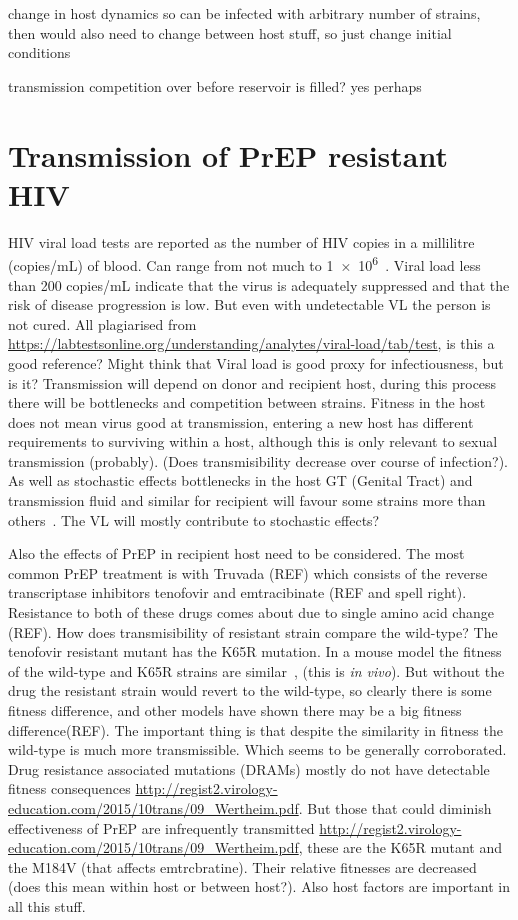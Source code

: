 \documentclass[DIV=15]{scrartcl}
\begin{document}
change in host dynamics so can be infected with arbitrary number of strains, then would also need to change between host stuff, so just change initial conditions

transmission competition over before reservoir is filled? yes perhaps

\fi

\iffalse

\section{Transmission of PrEP resistant HIV}

HIV viral load tests are reported as the number of HIV copies in a millilitre (copies/mL) of blood. Can range from not much to \SI{1e6}{}~\citep{fraser2007}.  Viral load less than 
 200 copies/mL indicate that the virus is adequately suppressed and that the risk of disease progression is low. But even with undetectable VL the person is not cured. All plagiarised from \url{https://labtestsonline.org/understanding/analytes/viral-load/tab/test}, is this a good reference? Might think that Viral load is good proxy for infectiousness, but is it? 
Transmission will depend on donor and recipient host, during this process there will be bottlenecks and competition between strains. Fitness in the host does not mean virus good at transmission, entering a new host has different requirements to surviving within a host, although this is only relevant to sexual transmission (probably). (Does transmisibility decrease over course of infection?). As well as stochastic effects bottlenecks in the host GT (Genital Tract) and transmission fluid and similar for recipient will favour some strains more than others~\cite{joseph2015}. The VL will mostly contribute to stochastic effects? 

Also the effects of PrEP in recipient host need to be considered. The most common PrEP treatment is with Truvada (REF) which consists of the reverse transcriptase inhibitors tenofovir and emtracibinate (REF and spell right). Resistance to both of these drugs comes about due to single amino acid change (REF). How does transmisibility of resistant strain compare the wild-type? The tenofovir resistant mutant has the K65R mutation. In a mouse model the fitness of the wild-type and K65R strains are similar~\cite{chateau2013}, (this is   \textit{in vivo}). But without the drug the resistant strain would revert to the wild-type, so clearly there is some fitness difference, and other models have shown there may be a big fitness difference(REF). The important thing is that despite the similarity in fitness the wild-type is much more transmissible. Which seems to  be generally corroborated. Drug resistance associated mutations (DRAMs) mostly do not have detectable fitness consequences 
 \url{http://regist2.virology-education.com/2015/10trans/09_Wertheim.pdf}. But those that could diminish effectiveness of PrEP are infrequently transmitted \url{http://regist2.virology-education.com/2015/10trans/09_Wertheim.pdf}, these are the K65R mutant and the M184V (that affects emtrcbratine). Their relative fitnesses are decreased (does this mean within host or between host?). Also  host factors are important in all this stuff.
\end{document}
